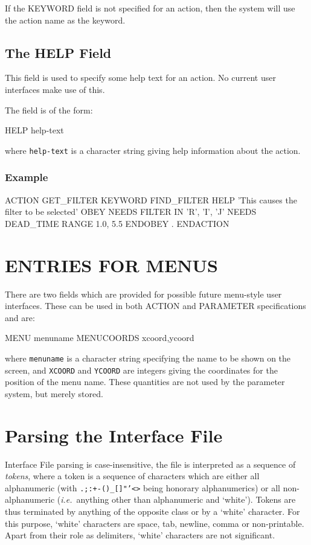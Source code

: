 \documentclass[twoside,11pt,nolof]{starlink}
\begin{document}
If the KEYWORD field is not specified for an action, then the system will
use the action name as the keyword.

\subsection{The HELP Field}

This field is used to specify some help text for an action. No current
user interfaces make use of this.

The field is of the form:
\begin{terminalv}
HELP help-text
\end{terminalv}
where \texttt{help-text} is a character string giving help information about the
action.
\subsubsection*{Example}
\begin{terminalv}
ACTION GET_FILTER
   KEYWORD FIND_FILTER
   HELP 'This causes the filter to be selected'
   OBEY
      NEEDS FILTER IN 'R', 'I', 'J'
      NEEDS DEAD_TIME RANGE 1.0, 5.5
   ENDOBEY
      .
ENDACTION
\end{terminalv}

\section{ENTRIES FOR MENUS}

There are two fields which are provided for possible future
menu-style user interfaces. These can be used in both ACTION and
PARAMETER specifications and are:
\begin{terminalv}
MENU menuname
MENUCOORDS xcoord,ycoord
\end{terminalv}
where \texttt{menuname} is a character string specifying the name to be shown on
the screen, and \texttt{XCOORD} and \texttt{YCOORD} are integers giving the
coordinates for the position of the menu name.
These quantities are not used by the parameter system, but merely stored.

\appendix
\newpage

\section{Parsing the Interface File
\label{parsing}}

Interface File parsing is case-insensitive, the file is
interpreted as a sequence of \emph{tokens}, where a token is a sequence of
characters which are either all alphanumeric (with \texttt{.;:+-()\_[]"'<>} being
honorary alphanumerics) or all non-alphanumeric (\emph{i.e.}\ anything other
than alphanumeric and `white').
Tokens are thus terminated by anything of the opposite class or by a `white'
character.
For this purpose, `white' characters are space, tab, newline, comma or
non-printable.
Apart from their role as delimiters, `white' characters are not significant.
\end{document}
